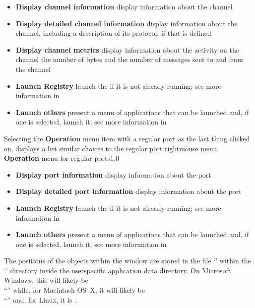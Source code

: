 \begin{itemize}
\item\textbf{Display channel information} display information about the channel
\item\exSp\textbf{Display detailed channel information} display information about the
channel, including a description of its protocol, if that is defined
\item\exSp\textbf{Display channel metrics} display information about the activity on the
channel \longDash{} the number of bytes and the number of messages sent to and from the
channel
\item\exSp\textbf{Launch Registry} launch the \emph{\RS} if it is not already running; see
more information in\\
\item\exSp\textbf{Launch others \textellipsis} present a menu of applications that can be
launched and, if one is selected, launch it; see more information in
\end{itemize}
\condPage{}
Selecting the \textbf{Operation} menu item with a regular port as the last thing clicked on,
displays a list similar choices to the regular port right\longDash{}mouse menu.\\
%
{\textbf{Operation} menu for regular ports}{1.0}
\begin{itemize}
\item\textbf{Display port information} display information about the port
\item\exSp\textbf{Display detailed port information} display information about the port
\item\exSp\textbf{Launch Registry} launch the \emph{\RS} if it is not already running; see
more information in\\
\item\exSp\textbf{Launch others \textellipsis} present a menu of applications that can be
launched and, if one is selected, launch it; see more information in
\end{itemize}
\condPage{}
The positions of the objects within the window are stored in the file
`' within the `' directory inside the
user\longDash{}specific application data directory.
On Microsoft Windows, this will likely be\\
``'' while, for Macintosh OS~X, it will likely be\\
``'' and, for Linux, it is \TBD.\\
\primaryEnd{}
